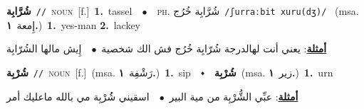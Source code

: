 \documentclass[10pt,a4paper,twoside]{article} %
\begin{document}
\begin{multicols}{2}
{\setlength\topsep{0pt}\textbf{\foreignlanguage{arabic}{شُرَّابِة}}\ {\color{gray}\texttt{//}\color{black}}\ \textsc{noun}\ [f.]\ \textbf{1.}~tassel\ \ $\bullet$\ \ \textsc{ph.} \color{gray} \foreignlanguage{arabic}{شُرَّابِة خُرُج}\color{black}\ {\color{gray}\texttt{/{\sffamily ʃurraːbit xuru(dʒ)}/}\color{black}}\ \color{gray} (msa. \foreignlanguage{arabic}{إِمعة}~\foreignlanguage{arabic}{\textbf{١.}})\color{black}\ \textbf{1.}~yes-man  \textbf{2.}~lackey\  \begin{flushright}\color{gray}\foreignlanguage{arabic}{\textbf{\underline{\foreignlanguage{arabic}{أمثلة}}}: يعني أنت لهالدرجة شُرّابِة خُرُج فش الك شخصية\ $\bullet$\ \  إِيش مالها الشُرّابِة}\end{flushright}\color{black}} \vspace{2mm}

{\setlength\topsep{0pt}\textbf{\foreignlanguage{arabic}{شُرْبِة}}\ {\color{gray}\texttt{//}\color{black}}\ \textsc{noun}\ [f.]\ \color{gray}(msa. \foreignlanguage{arabic}{رَشْفِة}~\foreignlanguage{arabic}{\textbf{١.}})\color{black}\ \textbf{1.}~sip\ \ $\smblkdiamond$\ \ \setlength\topsep{0pt}\textbf{\foreignlanguage{arabic}{شُرْبِة}}\ \color{gray}(msa. \foreignlanguage{arabic}{زير}~\foreignlanguage{arabic}{\textbf{١.}})\color{black}\ \textbf{1.}~urn\  \begin{flushright}\color{gray}\foreignlanguage{arabic}{\textbf{\underline{\foreignlanguage{arabic}{أمثلة}}}: عبِّي الشُّرْبِة من مية البير\ $\bullet$\ \  اسقيني شُُرْبِة مي بالله ماعليك أمر}\end{flushright}\color{black}} \vspace{2mm}


\end{multicols}
\end{document}
